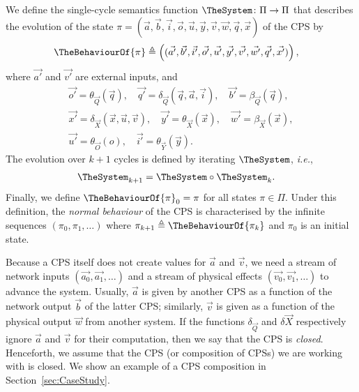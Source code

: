 {\begin{definition}
We define the single-cycle semantics function $\TheSystem\colon \Pi \rightarrow \Pi$ that describes the evolution of the state $\pi=(\vec{a},\vec{b},\vec{i},\vec{o},\vec{u},\vec{y},\vec{v},\vec{w},\vec{q},\vec{x})$ of the CPS by
\begin{align}
\TheBehaviourOf{\pi}&\triangleq\left((\vec{a'},\vec{b'},\vec{i'},\vec{o'},\vec{u'},\vec{y'},\vec{v'},\vec{w'},\vec{q'},\vec{x'})\right), 
\end{align}
where $\vec{a'}$ and $\vec{v'}$ are external inputs, and 
\begin{gather*}
\vec{o'}=\theta_{\vec{Q}}(\vec{q}),\quad 
\vec{q'}=\delta_{\vec{Q}}(\vec{q},\vec{a},\vec{i}),\quad 
\vec{b'}=\beta_{\vec{Q}}(\vec{q}),\\
\vec{x'}=\delta_{\vec{X}}(\vec{x},\vec{u},\vec{v}),\quad
\vec{y'}=\theta_{\vec{X}}(\vec{x}),\quad 
\vec{w'}=\beta_{\vec{X}}(\vec{x}),\\
\vec{u'}= \theta_{\vec{O}}(o),\quad\vec{i'}=\theta_{\vec{Y}}(\vec{y}).
\end{gather*}
The evolution over $k+1$ cycles is defined by iterating $\TheSystem$, \emph{i.e.},
\begin{align}\label{eq:kCycles}
\TheSystem_{k+1}&= \TheSystem \circ \TheSystem_{k}.
\end{align}
Finally, we define $\TheBehaviourOf{\pi}_{0}=\pi$ for all states $\pi \in \Pi$. Under this definition, the \emph{normal behaviour} of the CPS is characterised by the infinite sequences $(\pi_0, \pi_1, \ldots)$ where $\pi_{k+1}\triangleq\TheBehaviourOf{\pi_k}$ and $\pi_0$ is an initial state.%
\end{definition}
}
Because a CPS itself does not create values for $\vec{a}$ and $\vec{v}$, we need a stream of network inputs $(\vec{a_0}, \vec{a_1}, \ldots)$ and a stream of physical effects $(\vec{v_0}, \vec{v_1}, \ldots)$ to advance the system. Usually, $\vec{a}$ is given by another CPS as a function of the network output $\vec{b}$ of the latter CPS; similarly, $\vec{v}$ is given as a function of the physical output $\vec{w}$ from another system. If the functions $\delta_{\vec{Q}}$ and $\delta{\vec{X}}$ respectively ignore $\vec{a}$ and $\vec{v}$ for their computation, then we say that the CPS is \emph{closed}.
Henceforth, we assume that the CPS (or composition of CPSs) we are working with is closed. We show an example of a CPS composition in Section~\ref{sec:CaseStudy}.

